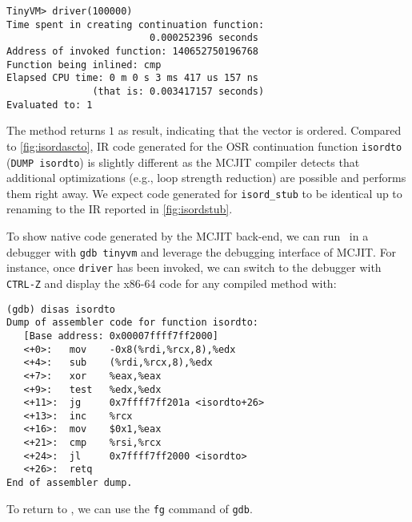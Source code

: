 \begin{small}
\begin{verbatim}
TinyVM> driver(100000)
Time spent in creating continuation function:
                         0.000252396 seconds
Address of invoked function: 140652750196768
Function being inlined: cmp
Elapsed CPU time: 0 m 0 s 3 ms 417 us 157 ns
               (that is: 0.003417157 seconds)
Evaluated to: 1
\end{verbatim}
\end{small}

\noindent The method returns $1$ as result, indicating that the vector is ordered. Compared to \myfigure\ref{fig:isordascto}, IR code generated for the OSR continuation function {\tt isordto} ({\tt DUMP isordto}) is slightly different as the MCJIT compiler detects that additional optimizations (e.g., loop strength reduction) are possible and performs them right away. We expect code generated for {\tt isord\_stub} to be identical up to renaming to the IR reported in \myfigure\ref{fig:isordstub}.

To show native code generated by the MCJIT back-end, we can run \tinyvm\ in a debugger with {\small\tt gdb tinyvm} and leverage the debugging interface of MCJIT. For instance, once {\tt driver} has been invoked, we can switch to the debugger with {\tt CTRL-Z} and display the x86-64 code for any compiled method with:
\begin{small}
\begin{verbatim}
(gdb) disas isordto
Dump of assembler code for function isordto:
   [Base address: 0x00007ffff7ff2000]
   <+0>:   mov    -0x8(%rdi,%rcx,8),%edx
   <+4>:   sub    (%rdi,%rcx,8),%edx
   <+7>:   xor    %eax,%eax
   <+9>:   test   %edx,%edx
   <+11>:  jg     0x7ffff7ff201a <isordto+26>
   <+13>:  inc    %rcx
   <+16>:  mov    $0x1,%eax
   <+21>:  cmp    %rsi,%rcx
   <+24>:  jl     0x7ffff7ff2000 <isordto>
   <+26>:  retq
End of assembler dump.
\end{verbatim}
\end{small}

\noindent To return to \tinyvm, we can use the {\tt fg} command of {\tt gdb}.